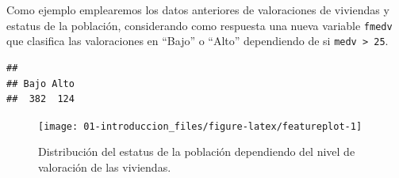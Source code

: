 \documentclass[
  spanish,
]{book}
\newenvironment{Shaded}{\begin{snugshade}}{\end{snugshade}}
\newcommand{\AttributeTok}[1]{\textcolor[rgb]{0.77,0.63,0.00}{#1}}
\newcommand{\CommentTok}[1]{\textcolor[rgb]{0.56,0.35,0.01}{\textit{#1}}}
\newcommand{\ConstantTok}[1]{\textcolor[rgb]{0.00,0.00,0.00}{#1}}
\newcommand{\DecValTok}[1]{\textcolor[rgb]{0.00,0.00,0.81}{#1}}
\newcommand{\FunctionTok}[1]{\textcolor[rgb]{0.00,0.00,0.00}{#1}}
\newcommand{\NormalTok}[1]{#1}
\newcommand{\OtherTok}[1]{\textcolor[rgb]{0.56,0.35,0.01}{#1}}
\newcommand{\SpecialCharTok}[1]{\textcolor[rgb]{0.00,0.00,0.00}{#1}}
\newcommand{\StringTok}[1]{\textcolor[rgb]{0.31,0.60,0.02}{#1}}
\theoremstyle{break}
\theoremstyle{definition}
\theoremstyle{definition}
\theoremstyle{definition}
\theoremstyle{definition}
\theoremstyle{remark}
\begin{document}
Como ejemplo emplearemos los datos anteriores de valoraciones de viviendas y estatus de la población, considerando como respuesta una nueva variable \texttt{fmedv} que clasifica las valoraciones en ``Bajo'' o ``Alto'' dependiendo de si \texttt{medv\ \textgreater{}\ 25}.

\begin{Shaded}
\end{Shaded}

\begin{verbatim}
## 
## Bajo Alto 
##  382  124
\end{verbatim}

\begin{Shaded}
\end{Shaded}

\begin{figure}[!htb]

{\centering \texttt{[image: 01-introduccion\_files/figure-latex/featureplot-1]} 

}

\caption{Distribución del estatus de la población dependiendo del nivel de valoración de las viviendas.}\label{fig:featureplot}
\end{figure}
\end{document}
